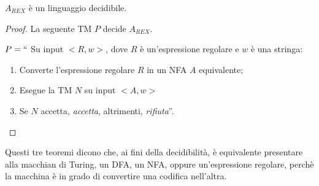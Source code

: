 \documentclass[12pt]{report}
\newcounter{theorem}
\begin{document}
\begin{theorem}{}{}
	$A_{REX}$ è un linguaggio decidibile.
\end{theorem}
\begin{proof}
	La seguente TM $P$ decide $A_{REX}$.

	$P = ``$ Su input $<R, w>$, dove $R$ è un'espressione regolare e $w$ è una stringa:
	\begin{enumerate}
		\item Converte l'espressione regolare $R$ in un NFA $A$ equivalente;
		\item Esegue la TM $N$ su input $<A, w>$
		\item Se $N$ accetta, \textit{accetta}, altrimenti, \textit{rifiuta}''.
	\end{enumerate}
\end{proof}
Questi tre teoremi dicono che, ai fini della decidibilità, è equivalente presentare alla macchian di Turing, un DFA, un NFA, oppure un'espressione regolare, perchè la macchina è in grado di convertire una codifica nell'altra.
\end{document}
